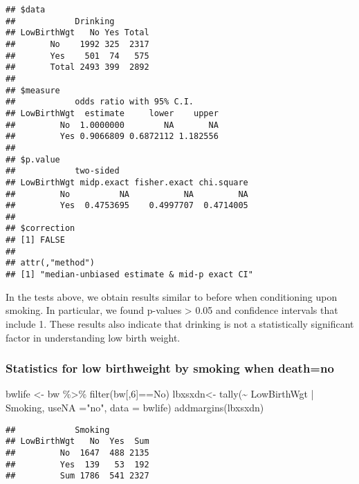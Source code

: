 \documentclass[
]{article}
\newenvironment{Shaded}{\begin{snugshade}}{\end{snugshade}}
\newcommand{\AttributeTok}[1]{\textcolor[rgb]{0.77,0.63,0.00}{#1}}
\newcommand{\DecValTok}[1]{\textcolor[rgb]{0.00,0.00,0.81}{#1}}
\newcommand{\FunctionTok}[1]{\textcolor[rgb]{0.00,0.00,0.00}{#1}}
\newcommand{\NormalTok}[1]{#1}
\newcommand{\OtherTok}[1]{\textcolor[rgb]{0.56,0.35,0.01}{#1}}
\newcommand{\SpecialCharTok}[1]{\textcolor[rgb]{0.00,0.00,0.00}{#1}}
\newcommand{\StringTok}[1]{\textcolor[rgb]{0.31,0.60,0.02}{#1}}
\begin{document}
\begin{verbatim}
## $data
##            Drinking
## LowBirthWgt   No Yes Total
##       No    1992 325  2317
##       Yes    501  74   575
##       Total 2493 399  2892
## 
## $measure
##            odds ratio with 95% C.I.
## LowBirthWgt  estimate     lower    upper
##         No  1.0000000        NA       NA
##         Yes 0.9066809 0.6872112 1.182556
## 
## $p.value
##            two-sided
## LowBirthWgt midp.exact fisher.exact chi.square
##         No          NA           NA         NA
##         Yes  0.4753695    0.4997707  0.4714005
## 
## $correction
## [1] FALSE
## 
## attr(,"method")
## [1] "median-unbiased estimate & mid-p exact CI"
\end{verbatim}

In the tests above, we obtain results similar to before when
conditioning upon smoking. In particular, we found p-values
\textgreater{} 0.05 and confidence intervals that include 1. These
results also indicate that drinking is not a statistically significant
factor in understanding low birth weight.

\hypertarget{statistics-for-low-birthweight-by-smoking-when-deathno}{%
\subsubsection{Statistics for low birthweight by smoking when
death=no}\label{statistics-for-low-birthweight-by-smoking-when-deathno}}

\begin{Shaded}
\begin{Highlighting}[]
\NormalTok{bwlife }\OtherTok{\textless{}{-}}\NormalTok{ bw }\SpecialCharTok{\%\textgreater{}\%} \FunctionTok{filter}\NormalTok{(bw[,}\DecValTok{6}\NormalTok{]}\SpecialCharTok{==}\StringTok{\textquotesingle{}No\textquotesingle{}}\NormalTok{)}
\NormalTok{lbxsxdn}\OtherTok{\textless{}{-}} \FunctionTok{tally}\NormalTok{(}\SpecialCharTok{\textasciitilde{}}\NormalTok{ LowBirthWgt }\SpecialCharTok{|}\NormalTok{ Smoking, }\AttributeTok{useNA =}\StringTok{"no"}\NormalTok{, }\AttributeTok{data =}\NormalTok{ bwlife)}
\FunctionTok{addmargins}\NormalTok{(lbxsxdn)}
\end{Highlighting}
\end{Shaded}

\begin{verbatim}
##            Smoking
## LowBirthWgt   No  Yes  Sum
##         No  1647  488 2135
##         Yes  139   53  192
##         Sum 1786  541 2327
\end{verbatim}
\end{document}
